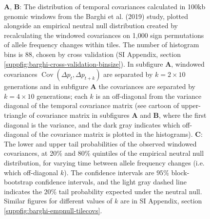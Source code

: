 \documentclass[9pt,twocolumn,twoside]{pnas-new}
\DeclareMathOperator{\cov}{Cov}
\begin{document}
\begin{figure}
  \caption{\footnotesize {\bf A}, {\bf B}: The distribution of temporal
    covariances calculated in 100kb genomic windows from the
    Barghi et al. (2019) study, plotted alongside an empirical neutral null
    distribution created by recalculating the windowed covariances on 1,000
    sign permutations of allele frequency changes within tiles. The number of histogram
    bins is 88, chosen by cross validation (SI Appendix, section
    \ref{suppfig:barghi-cross-validation-binsize}). In subfigure {\bf A},
    windowed covariances $\cov(\Delta p_t, \Delta p_{t+k})$ are separated by
    $k=2 \times 10$ generations and in subfigure {\bf A} the covariances are
    separated by $k=4 \times 10$ generations; each $k$ is an off-diagonal from
    the variance diagonal of the temporal covariance matrix (see cartoon of
    upper-triangle of covariance matrix in subfigures {\bf A} and {\bf B},
    where the first diagonal is the variance, and the dark gray indicates which
    off-diagonal of the covariance matrix is plotted in the histograms). {\bf
    C}: The lower and upper tail probabilities of the observed windowed
    covariances, at 20\% and 80\% quintiles of the empirical neutral null
    distribution, for varying time between allele frequency changes (i.e. which
    off-diagonal $k$). The confidence intervals are  $95\%$ block-bootstrap
  confidence intervals, and the light gray dashed line indicates the 20\% tail
probability expected under the neutral null. Similar figures for different
values of $k$ are in SI Appendix, section
\ref{suppfig:barghi-empnull-tilecovs}. }

    \label{fig:figure-3} 
\end{figure}
\end{document}
